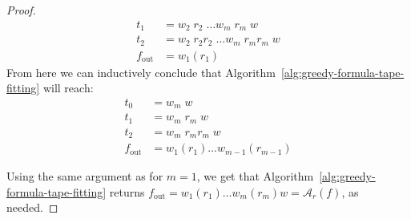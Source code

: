 \begin{proof}
\begin{align*}
        t_1          & = w_2\; r_2\; \dots w_m\; r_m\; w        \\
        t_2          & = w_2\;  r_2r_2\; \dots w_m\; r_mr_m\; w \\
        f_\text{out} & = w_1 (r_1)
    \end{align*}
    From here we can inductively conclude that Algorithm~\ref{alg:greedy-formula-tape-fitting} will reach:
    \begin{align*}
        t_0          & = w_m\; w                           \\
        t_1          & = w_m\; r_m\; w                     \\
        t_2          & = w_m\; r_mr_m\; w                  \\
        f_\text{out} & = w_1 (r_1) \dots w_{m-1} (r_{m-1})
    \end{align*}

    Using the same argument as for $m=1$, we get that Algorithm~\ref{alg:greedy-formula-tape-fitting} returns $f_\text{out} = w_1 (r_1) \dots w_m (r_m) w = \mathcal{A}_r(f)$, as needed.




\end{proof}


